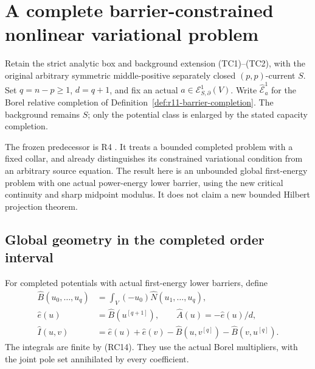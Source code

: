 \documentclass[11pt,a4paper]{article}
\numberwithin{equation}{section}
\theoremstyle{definition}
\theoremstyle{remark}
\begin{document}


\section{A complete barrier-constrained nonlinear variational problem}
\label{sec:r11-completed-barrier-variational}

Retain the strict analytic box and background extension
(TC1)--(TC2), with the original arbitrary symmetric
middle-positive separately closed $(p,p)$-current $S$.
Set $q=n-p\geq1$, $d=q+1$, and fix an actual
$a\in\mathcal E^1_{S,\partial}(V)$.
Write $\widehat{\mathcal E}^1_a$ for the Borel relative
completion of Definition~\ref{def:r11-barrier-completion}.
The background remains $S$; only the potential class
is enlarged by the stated capacity completion.

The frozen predecessor is R4
.
It treats a bounded completed problem with a fixed
collar, and already distinguishes its constrained
variational condition from an arbitrary source equation.
The result here is an unbounded global first-energy
problem with one actual power-energy lower barrier,
using the new critical continuity and sharp midpoint
modulus.  It does not claim a new bounded Hilbert
projection theorem.

\subsection{Global geometry in the completed order interval}

For completed potentials with actual first-energy
lower barriers, define
\[
\begin{split}
 \widehat B(u_0,\ldots,u_q)
    &=\int_V(-u_0)\widehat N(u_1,\ldots,u_q),\\
 \widehat e(u)&=\widehat B(u^{[q+1]}),\qquad
 \widehat A(u)=-\widehat e(u)/d,\\
 \widehat I(u,v)
    &=\widehat e(u)+\widehat e(v)
       -\widehat B(u,v^{[q]})-\widehat B(v,u^{[q]}).
\end{split}
 \tag{BV1}
\]
The integrals are finite by (RC14).  They use the
actual Borel multipliers, with the joint pole set
annihilated by every coefficient.
\end{document}
